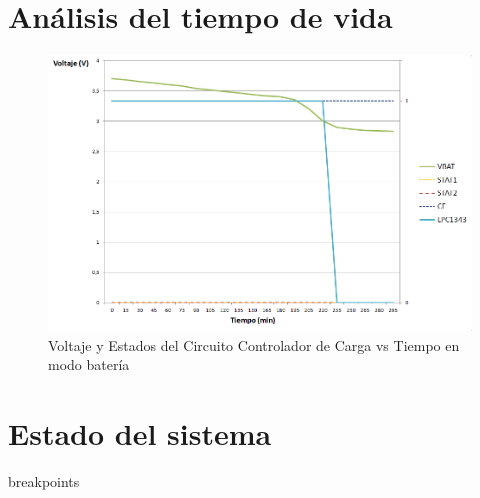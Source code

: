 \section{Análisis del tiempo de vida}
\label{sec:vida}
\vspace{30px}
\begin{figure}[h!]
	\centering
    \includegraphics[width=1.2\textwidth]{./Figures/descarga.png}
    	\caption{Voltaje y Estados del Circuito Controlador de Carga vs Tiempo en modo batería}
	\label{fig:curva}
\end{figure}

\section{Estado del sistema}
\label{sec:estado}
breakpoints


